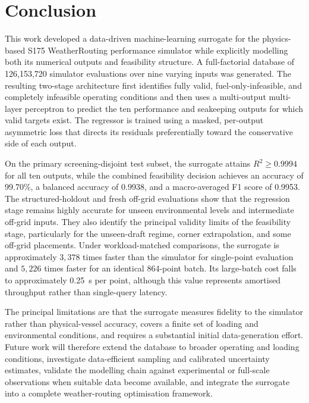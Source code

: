 \documentclass[final,5p,times,twocolumn,numbers]{elsarticle}
\begin{document}
\section{Conclusion}\label{sec:conclusion}
This work developed a data-driven machine-learning surrogate for the physics-based S175 WeatherRouting performance simulator while explicitly modelling both its numerical outputs and feasibility structure. A full-factorial database of 126{,}153{,}720 simulator evaluations over nine varying inputs was generated. The resulting two-stage architecture first identifies fully valid, fuel-only-infeasible, and completely infeasible operating conditions and then uses a multi-output multi-layer perceptron to predict the ten performance and seakeeping outputs for which valid targets exist. The regressor is trained using a masked, per-output asymmetric loss that directs its residuals preferentially toward the conservative side of each output.

On the primary screening-disjoint test subset, the surrogate attains $R^2\geq0.9994$ for all ten outputs, while the combined feasibility decision achieves an accuracy of 99.70\%, a balanced accuracy of 0.9938, and a macro-averaged F1 score of 0.9953. The structured-holdout and fresh off-grid evaluations show that the regression stage remains highly accurate for unseen environmental levels and intermediate off-grid inputs. They also identify the principal validity limits of the feasibility stage, particularly for the unseen-draft regime, corner extrapolation, and some off-grid placements. Under workload-matched comparisons, the surrogate is approximately $3{,}378$ times faster than the simulator for single-point evaluation and $5{,}226$ times faster for an identical 864-point batch. Its large-batch cost falls to approximately 0.25~\textmu s per point, although this value represents amortised throughput rather than single-query latency.

The principal limitations are that the surrogate measures fidelity to the simulator rather than physical-vessel accuracy, covers a finite set of loading and environmental conditions, and requires a substantial initial data-generation effort. Future work will therefore extend the database to broader operating and loading conditions, investigate data-efficient sampling and calibrated uncertainty estimates, validate the modelling chain against experimental or full-scale observations when suitable data become available, and integrate the surrogate into a complete weather-routing optimisation framework.
\end{document}
